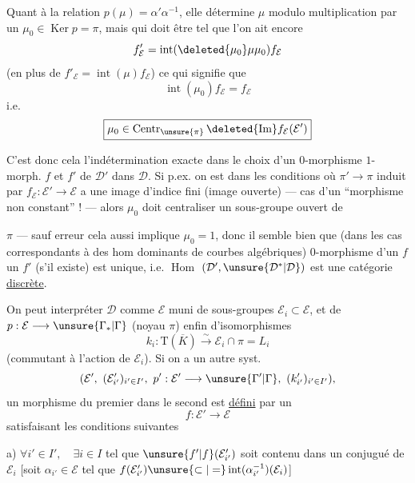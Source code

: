 Quant à la relation $p(\mu)=\alpha'\alpha^{-1}$, elle détermine $\mu$ modulo multiplication  par un  $\mu_0\in\operatorname{Ker}p=\pi$, mais qui doit être tel que l'on ait encore
\[
f'_{\mathcal E}=\operatorname{int}(\deleted{\mu_0}\mu\mu_0)f_{\mathcal E}
\]
(en plus de $f'_{\mathcal E}=\operatorname{int}(\mu)f_{\mathcal E}$) ce qui signifie  que
\[
\operatorname{int}(\mu_0)f_{\mathcal E}=f_{\mathcal E}
\]
i.e.
\[
\boxed{\mu_0\in\operatorname{Centr}_{\unsure{\pi}}\deleted{\operatorname{Im}}f_{\mathcal E}(\mathcal E')}
\]

C'est donc cela l'indétermination exacte dans le choix d'un $0$-morphisme  $1$-morph.  $f$ et $f'$ de $\mathcal D'$ dans $\mathcal D$.
Si p.ex. on est dans les conditions où
$\pi'\longrightarrow\pi$ induit par $f_{\mathcal E}:\mathcal E'\longrightarrow\mathcal E$  a une image d'indice fini (image ouverte)
--- cas d'un ``morphisme non constant'' ! ---
alors $\mu_0$ doit centraliser un sous-groupe ouvert de

$\pi$ --- sauf erreur cela aussi implique $\mu_0=1$, donc il semble bien que  (dans les cas correspondants à des hom dominants de courbes algébriques)   $0$-morphisme d'un $f$  un $f'$ (s'il existe) est unique, i.e. \uline{$\operatorname{Hom}$} $(\mathcal D',\unsure{\mathcal D^*|\mathcal D})$ est une catégorie \uline{discrète}.

On peut interpréter $\mathcal D$ comme $\mathcal E$ muni de sous-groupes $\mathcal E_i\subset\mathcal E$, et de $p:\mathcal E\longrightarrow\unsure{\Gamma_*|\Gamma}$ (noyau $\pi$) enfin d'isomorphismes
\[
k_i:\mathrm T(\overline K)\xrightarrow{\sim}\mathcal E_i\cap\pi=L_i
\]
(commutant à l'action de $\mathcal E_i$).
Si on a un autre syst.
\[
(\mathcal E',\ (\mathcal E'_{i'})_{i'\in I'},\ p':\mathcal E'\longrightarrow\unsure{\Gamma'|\Gamma},\ (k'_{i'})_{i'\in I'}),
\]
un morphisme du premier dans le second est \uline{défini} par un
\[
f:\mathcal E'\longrightarrow\mathcal E
\]
satisfaisant les conditions suivantes


a) $\forall i'\in I',\quad\exists i\in I$ tel que $\unsure{f'|f}(\mathcal E'_{i'})$ soit contenu dans un conjugué de $\mathcal E_i$
[soit $\alpha_{i'}\in\mathcal E$ tel que
$f(\mathcal E'_{i'})\unsure{\subset|=}\operatorname{int}(\alpha_{i'}^{-1})(\mathcal E_i)$]

